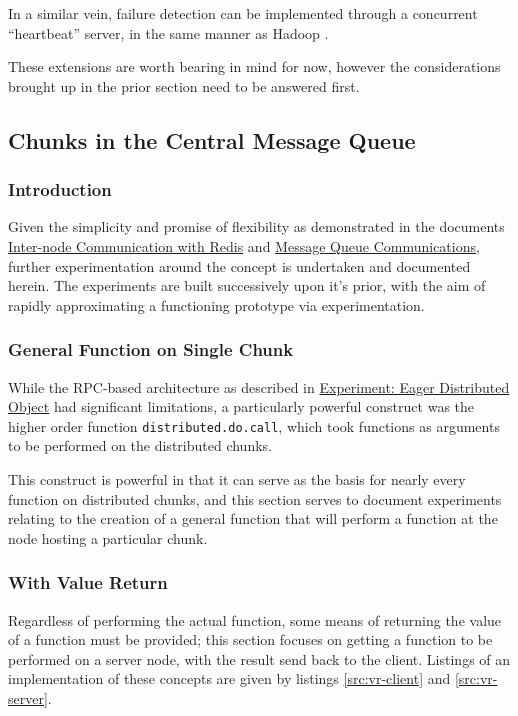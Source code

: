 In a similar vein, failure detection can be implemented through a
concurrent ``heartbeat'' server, in the same manner as Hadoop
\cite{white2012hadoop}.

These extensions are worth bearing in mind for now, however the
considerations brought up in the prior section need to be answered
first.

\subsection{Chunks in the Central Message Queue}

\subsubsection{Introduction}

Given the simplicity and promise of flexibility as demonstrated in the
documents \href{inter-node-comm-w-redis.pdf}{Inter-node Communication with
Redis} and \href{message-queues-comms.pdf}{Message Queue Communications},
further experimentation around the concept is undertaken and documented herein.
The experiments are built successively upon it's prior, with the aim of rapidly
approximating a functioning prototype via experimentation.

\subsubsection{General Function on Single Chunk}

While the RPC-based architecture as described in
\href{experiment-eager-dist-obj-pre.pdf}{Experiment: Eager Distributed Object}
had significant limitations, a particularly powerful construct was the higher
order function \texttt{distributed.do.call}, which took functions as arguments
to be performed on the distributed chunks.

This construct is powerful in that it can serve as the basis for nearly every
function on distributed chunks, and this section serves to document experiments
relating to the creation of a general function that will perform a function at
the node hosting a particular chunk.

\subsubsection{With Value Return}\label{sec:val-ret}

Regardless of performing the actual function, some means of returning the value
of a function must be provided; this section focuses on getting a function to
be performed on a server node, with the result send back to the client.
Listings of an implementation of these concepts are given by listings
\cref{src:vr-client} and \cref{src:vr-server}.


